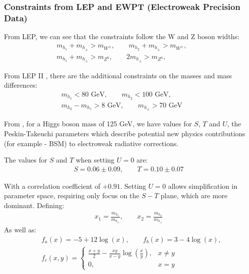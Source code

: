 \documentclass[12pt]{article}
\begin{document}
\subsubsection{Constraints from LEP and EWPT (Electroweak Precision Data)}
From LEP, we can see that the constraints follow the W and Z boson widths:
\begin{align}
    m_{h_1} + m_{h_\pm} > m_{W^\pm}, \qquad
    m_{h_2} + m_{h_\pm} > m_{W^\pm}, \qquad  \label{LEP2_1}
    \\
    m_{h_1} + m_{h_\pm} > m_{Z^0}, \qquad
    2m_{h_\pm} > m_{Z^0}, \qquad  \label{LEP2_2}
\end{align}

From LEP II \cite{Lundstr_m_2009}, there are the additional constraints on the masses and mass differences:
\begin{align}
    m_{h_1}< 80 \text{ GeV}, \qquad
    m_{h_2}< 100 \text{ GeV}, \qquad \label{LEP2_3}
    \\
    m_{h_2} - m_{h_1} > 8\text{ GeV}, \qquad
    m_{h_\pm}> 70\text{ GeV} \qquad \label{LEP2_4}
\end{align}

From \cite{gfitter2014global}, for a Higgs boson mass of 125 GeV, we have values for $S$, $T$ and $U$, the Peskin-Takeuchi parameters \cite{PeskinTakeuchi1990} which describe potential new physics contributions (for example - BSM) to electroweak radiative corrections.

 The values for $S$ and $T$ when setting $U = 0$ are:
 \begin{align}
     S = 0.06 \pm0.09, \qquad
     T = 0.10\pm0.07
 \end{align}

With a correlation coefficient of $+0.91$. Setting $U = 0$ allows simplification in parameter space, requiring only focus on the $S-T$ plane, which are more dominant. Defining:
\begin{align}
    x_1 = \frac{m_{h_1}}{m_{h_\pm}}, \qquad 
    x_2 = \frac{m_{h_2}}{m_{h_\pm}}
\end{align}
As well as:
\begin{align}
    &f_a(x) = -5 +12\log(x), \qquad
    f_b(x) = 3-4\log(x),
    \\
    &f_c(x,y) = 
    \begin{cases}
        \frac{x+y}{2}-\frac{xy}{x-y}\log{\left(\frac{x}{y}\right)}, & x\neq y\\
        0, & x = y
    \end{cases}
\end{align}
\end{document}
